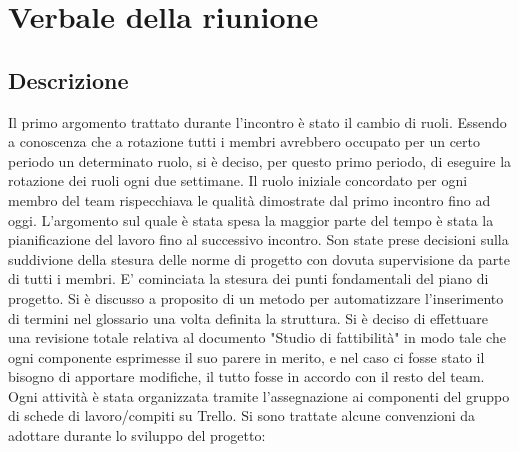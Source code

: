 \section{Verbale della riunione}

\subsection{Descrizione}
Il primo argomento trattato durante l'incontro è stato il cambio di ruoli.
Essendo a conoscenza che a rotazione tutti i membri avrebbero occupato per un certo periodo un determinato ruolo, si è deciso, per questo primo periodo, di eseguire la rotazione dei ruoli ogni due settimane. Il ruolo iniziale concordato per ogni membro del team rispecchiava le qualità dimostrate dal primo incontro fino ad oggi.
\newline \newline
L'argomento sul quale è stata spesa la maggior parte del tempo è stata la pianificazione del lavoro fino al successivo incontro. Son state prese decisioni sulla suddivione della stesura delle norme di progetto con dovuta supervisione da parte di tutti i membri. E' cominciata la stesura dei punti fondamentali del piano di progetto. Si è discusso a proposito di un metodo per automatizzare l'inserimento di termini nel glossario una volta definita la struttura. Si è deciso di effettuare una revisione totale relativa al documento "Studio di fattibilità" in modo tale che ogni componente esprimesse il suo parere in merito, e nel caso ci fosse stato il bisogno di apportare modifiche, il tutto fosse in accordo con il resto del team. Ogni attività è stata organizzata tramite l'assegnazione ai componenti del gruppo di schede di lavoro/compiti su Trello. 
\newline \newline
Si sono trattate alcune convenzioni da adottare durante lo sviluppo del progetto:
